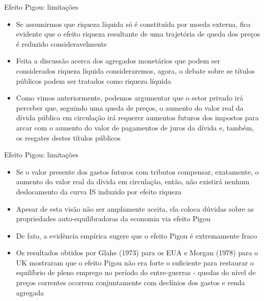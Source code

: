 \documentclass[10pt]{beamer}
\begin{document}
\begin{frame}{Efeito Pigou: limitações}
    \begin{itemize}
        \item Se assumirmos que riqueza líquida só é constituída por moeda externa, fica evidente que o efeito riqueza resultante de uma trajetória de queda dos preços é reduzido consideravelmente
        \bigskip
        \item Feita a discussão acerca dos agregados monetários que podem ser considerados riqueza líquida consideraremos, agora, o debate sobre se títulos públicos podem ser tratados como riqueza líquida
        \bigskip
        \item Como vimos anteriormente, podemos argumentar que o setor privado irá perceber que, seguindo uma queda de preços, o aumento do valor real da dívida pública em circulação irá requerer aumentos futuros dos impostos para arcar com o aumento do valor de pagamentos de juros da dívida e, também, os resgates destes títulos públicos
    \end{itemize}
\end{frame}

\begin{frame}{Efeito Pigou: limitações}
    \begin{itemize}
        \item Se o valor presente dos gastos futuros com tributos compensar, exatamente, o aumento do valor real da dívida em circulação, então, não existirá nenhum deslocamento da curva IS induzido por efeito riqueza
        \bigskip
        \item Apesar de esta visão não ser amplamente aceita, ela coloca dúvidas sobre as propriedades auto-equilibradoras da economia via efeito Pigou
        \bigskip
        \item De fato, a evidência empírica sugere que o efeito Pigou é extremamente fraco
        \bigskip
        \item Os resultados obtidos por Glahe (1973) para os EUA e Morgan (1978) para o UK mostraram que o efeito Pigou não era forte o suficiente para restaurar o equilíbrio de pleno emprego no período do entre-guerras - quedas do nível de preços correntes ocorrem conjuntamente com declínios dos gastos e renda agregada
    \end{itemize}
\end{frame}
\end{document}
